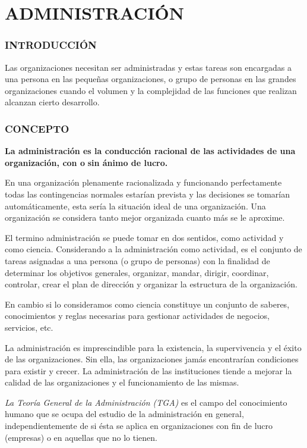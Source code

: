\section*{ADMINISTRACIÓN}
\subsubsection*{INTRODUCCIÓN}
Las organizaciones necesitan ser administradas y estas tareas son encargadas a una persona en las pequeñas organizaciones, o grupo de personas en las grandes organizaciones cuando el volumen y la complejidad de las funciones que realizan alcanzan cierto desarrollo.

\subsubsection*{CONCEPTO}
\textbf{La administración es la conducción racional de las actividades de una organización, con o} \textbf{sin ánimo de lucro.}

En una organización plenamente racionalizada y funcionando perfectamente todas las contingencias normales estarían prevista y las decisiones se tomarían automáticamente, esta sería la situación ideal de una organización. Una organización se considera tanto mejor organizada cuanto más se le aproxime.

El termino administración se puede tomar en dos sentidos, como actividad y como ciencia. Considerando a la administración como actividad, es el conjunto de tareas asignadas a una persona (o grupo de personas) con la finalidad de determinar los objetivos generales, organizar, mandar, dirigir, coordinar, controlar, crear el plan de dirección y organizar la estructura de la organización.

En cambio si lo consideramos como ciencia constituye un conjunto de saberes, conocimientos y reglas necesarias para gestionar actividades de negocios, servicios, etc.

La administración es imprescindible para la existencia, la supervivencia y el éxito de las organizaciones. Sin ella, las organizaciones jamás encontrarían condiciones para existir y crecer. La administración de las instituciones tiende a mejorar la calidad de las organizaciones y el funcionamiento de las mismas.

\textit{La Teoría General de la Administración (TGA) }es el campo del conocimiento humano que se ocupa del estudio de la administración en general, independientemente de si ésta se aplica en organizaciones con fin de lucro (empresas) o en aquellas que no lo tienen.



